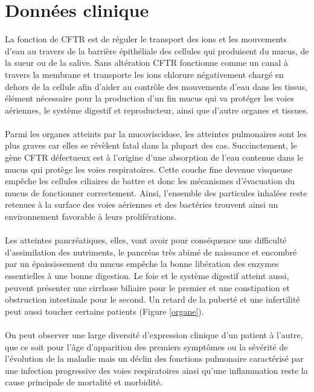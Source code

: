 	\chapter{Données clinique}
La fonction de CFTR est de réguler le transport des ions et les mouvements d’eau au travers de la barrière épithéliale des cellules qui produisent du mucus, de la sueur ou de la salive. Sans altération CFTR fonctionne comme un canal à travers la membrane et transporte les ions chlorure négativement chargé en dehors de la cellule afin d’aider au contrôle des mouvements d’eau dans les tissus, élément nécessaire pour la production d’un fin mucus qui va protéger les voies aériennes, le système digestif et reproducteur, ainsi que d’autre organes et tissues.\\ 
\\
Parmi les organes atteints par la mucoviscidose, les atteintes pulmonaires sont les plus graves car elles se révèlent fatal dans la plupart des cas. Succinctement, le gène CFTR défectueux est à l’origine d’une absorption de l’eau contenue dans le mucus qui protège les voies respiratoires. Cette couche fine devenue visqueuse empêche les cellules ciliaires de battre et donc les mécanismes d’évacuation du mucus de fonctionner correctement. Ainsi, l’ensemble des particules inhalées reste retenues à la surface des voies aériennes et des bactéries trouvent ainsi un environnement favorable à leurs proliférations.\\ 
\\
Les atteintes pancréatiques, elles, vont avoir pour conséquence une difficulté d’assimilation des nutriments, le pancréas très abimé de naissance et encombré par un épaississement du mucus empêche la bonne libération des enzymes essentielles à une bonne digestion. Le foie et le système digestif atteint aussi, peuvent présenter une cirrhose biliaire pour le premier et une constipation et obstruction intestinale pour le second. Un retard de la puberté et une infertilité peut aussi toucher certains patients (Figure \ref{organe}).\\
\\
On peut observer une large diversité d’expression clinique d’un patient à l’autre, que ce soit pour l’âge d’apparition des premiers symptômes ou la sévérité de l’évolution de la maladie mais un déclin des fonctions pulmonaire caractérisé par une infection progressive des voies respiratoires ainsi qu’une inflammation reste la cause principale de mortalité et morbidité.

